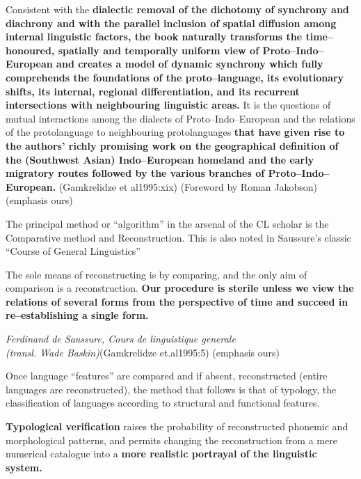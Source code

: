 \begin{myquote}
Consistent with the \textbf{dialectic removal of the dichotomy of synchrony and diachrony and with the parallel inclusion of spatial diffusion among internal linguistic factors, the book naturally transforms the time–honoured, spatially and temporally uniform view of Proto–Indo–European and creates a model of dynamic synchrony which fully comprehends the foundations of the proto–language, its evolutionary shifts, its internal, regional differentiation, and its recurrent intersections with neighbouring linguistic areas.} It is the questions of mutual interactions among the dialects of Proto–Indo–European and the relations of the protolanguage to neighbouring protolanguages \textbf{that have given rise to the authors' richly promising work on the geographical definition of the (Southwest Asian) Indo–European homeland and the early migratory routes followed by the various branches of Proto–Indo–European.} (Gamkrelidze et al1995:xix) (Foreword by Roman Jakobson) (emphasis ours)
\end{myquote}

The principal method or “algorithm” in the arsenal of the CL scholar is the Comparative method and Reconstruction. This is also noted in Saussure’s classic “Course of General Linguistics”

\begin{myquote}
The sole means of reconstructing is by comparing, and the only aim of comparison is a reconstruction. \textbf{Our procedure is sterile unless we view the relations of several forms from the perspective of time and succeed in re–establishing a single form.}
\end{myquote}

\begin{myquote}
\textit{Ferdinand de Saussure, Cours de linguistique generale}\\\textit{(transl. Wade Baskin)}(Gamkrelidze et.al1995:5) (emphasis ours)
\end{myquote}

Once language “features” are compared and if absent, reconstructed (entire languages are reconstructed), the method that follows is that of typology, the classification of languages according to structural and functional features.

\begin{myquote}
\textbf{Typological verification} raises the probability of reconstructed phonemic and morphological patterns, and permits changing the reconstruction from a mere numerical catalogue into a \textbf{more realistic portrayal of the linguistic system.}
\end{myquote}

